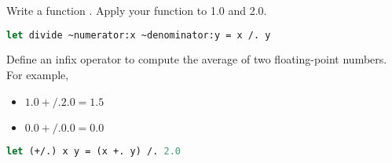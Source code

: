 \problem[divide]
Write a function . Apply your function to 1.0 and 2.0.

\begin{lstlisting}[language=OCaml]
let divide ~numerator:x ~denominator:y = x /. y
\end{lstlisting}

\problem[average]
Define an infix operator  to compute the average of two floating-point numbers. For example,
\begin{itemize}
	\item $1.0 +/. 2.0 = 1.5$
	\item $0.0 +/. 0.0 = 0.0$
\end{itemize}

\begin{lstlisting}[language=OCaml]
let (+/.) x y = (x +. y) /. 2.0
\end{lstlisting}